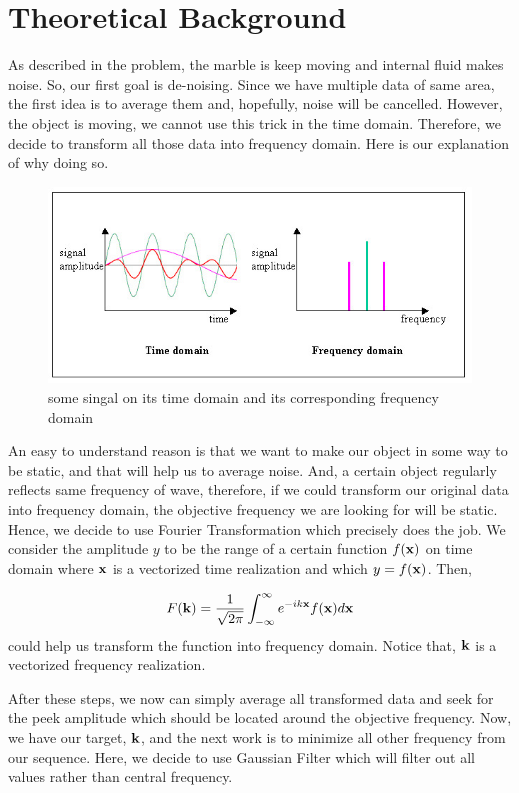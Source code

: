 \documentclass[12pt]{article}
\begin{document}
\section{Theoretical Background}
As described in the problem, the marble is keep moving and internal fluid makes noise. 
So, our first goal is de-noising. Since we have multiple data of same area, the first idea is to average them and, hopefully, noise will be cancelled. However, the object is moving, we cannot use this trick in the time domain. Therefore, we decide to transform all those data into frequency domain. Here is our explanation of why doing so.

\begin{figure}[H]
  \includegraphics[width=\linewidth]{time_domain_vs_frequency_domain.jpg}
  \caption{some singal on its time domain and its corresponding frequency domain}
  \label{fig:time_frequency}
\end{figure}

An easy to understand reason is that we want to make our object in some way to be static, and that will help us to average noise. And, a certain object regularly reflects same frequency of wave, therefore, if we could transform our original data into frequency domain, the objective frequency we are looking for will be static.\\
Hence, we decide to use Fourier Transformation which precisely does the job. We consider the amplitude $y$ to be the range of a certain function $f(\bf x)$ on time domain where $\bf x$ is a vectorized time realization and which $y = f( {\bf x}) $. Then, 

 \[ F({\bf k}) = \frac{1}{\sqrt{2\pi}} \int_{-\infty}^{\infty} e^{-ik{\bf x}}f({\bf x}) d{\bf x} \]
 could help us transform the function into frequency domain. Notice that, ${\bf k}$ is a vectorized frequency realization.
 
 After these steps, we now can simply average all transformed data and seek for the peek amplitude which should be located around the objective frequency.
 Now, we have our target, ${\bf k}$, and the next work is to minimize all other frequency from our sequence. Here, we decide to use Gaussian Filter which will filter out all values rather than central frequency.\\
\end{document}
